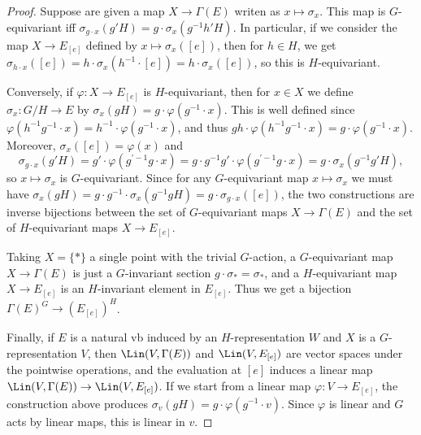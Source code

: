 \begin{proof}
    Suppose are given a map $X\to\Gamma(E)$ writen as $x\mapsto \sigma_x$. This map is $G$-equivariant iff $\sigma_{g\cdot x}(g'H)=g\cdot\sigma_x(g^{-1}h'H)$. In particular, if we consider the map $X\to E_{[e]}$ defined by $x\mapsto \sigma_x([e])$, then for $h\in H$, we get $\sigma_{h\cdot x}([e])=h\cdot \sigma_x(h^{-1}\cdot[e])=h\cdot\sigma_x([e])$, so this is $H$-equivariant. 
    
    Conversely, if $\varphi:X\to E_{[e]}$ is $H$-equivariant, then for $x\in X$ we define $\sigma_x:G\slash H\to E$ by $\sigma_x(gH)=g\cdot \varphi(g^{-1}\cdot x)$. This is well defined since $\varphi(h^{-1}g^{-1}\cdot x)=h^{-1}\cdot \varphi(g^{-1}\cdot x)$, and thus $gh\cdot \varphi(h^{-1}g^{-1}\cdot x)=g\cdot \varphi(g^{-1}\cdot x)$. Moreover, $\sigma_x([e])=\varphi(x)$ and 
    \[\sigma_{g\cdot x}(g'H)=g'\cdot \varphi(g^{\prime-1}g\cdot x)=g\cdot g^{-1}g'\cdot \varphi(g^{\prime-1}g\cdot x)=g\cdot\sigma_x(g^{-1}g'H),\]
    so $x\mapsto \sigma_x$ is $G$-equivariant. Since for any $G$-equivariant map $x\mapsto \sigma_x$ we must have $\sigma_x(gH)=g\cdot g^{-1}\cdot \sigma_x(g^{-1}gH)=g\cdot \sigma_{g\cdot x}([e])$, the two constructions are inverse bijections between the set of $G$-equivariant maps $X\to \Gamma(E)$ and the set of $H$-equivariant maps $X\to E_{[e]}$.

    Taking $X=\{*\}$ a single point with the trivial $G$-action, a $G$-equivariant map $X\to \Gamma(E)$ is just a $G$-invariant section $g\cdot \sigma_*=\sigma_*$, and a $H$-equivariant map $X\to E_{[e]}$ is an $H$-invariant element in $E_{[e]}$. Thus we get a bijection $\Gamma(E)^G\to (E_{[e]})^H$.

    Finally, if $E$ is a natural \gls{vb} induced by an $H$-representation $W$ and $X$ is a $G$-representation $V$, then $\Lin(V,\Gamma(E))$ and $\Lin(V,E_{[e]})$ are vector spaces under the pointwise operations, and the evaluation at $[e]$ induces a linear map $\Lin(V,\Gamma(E))\to \Lin(V,E_{[e]})$. If we start from a linear map $\varphi:V\to E_{[e]}$, the construction above produces $\sigma_v(gH)=g\cdot \varphi(g^{-1}\cdot v)$. Since $\varphi$ is linear and $G$ acts by linear maps, this is linear in $v$.
\end{proof}

